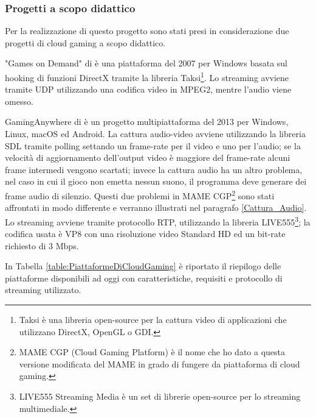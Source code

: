 \subsubsection{Progetti a scopo didattico}
Per la realizzazione di questo progetto sono stati presi in considerazione due progetti di cloud gaming a scopo didattico.

"Games on Demand" di \parencite{ARealTimeStreamingGamesonDemandSystem} è una piattaforma del 2007 per Windows basata sul hooking di funzioni DirectX tramite la libreria Taksi\footnote{Taksi è una libreria open-source per la cattura video di applicazioni che utilizzano DirectX, OpenGL o GDI.}. Lo streaming avviene tramite UDP utilizzando una codifica video in MPEG2, mentre l'audio viene omesso.

GamingAnywhere di \parencite{GamingAnywhere} è un progetto multipiattaforma del 2013 per Windows, Linux, macOS ed Android. La cattura audio-video avviene utilizzando la libreria SDL tramite polling settando un frame-rate per il video e uno per l'audio; se la velocità di aggiornamento dell'output video è maggiore del frame-rate alcuni frame intermedi vengono scartati; invece la cattura audio ha un altro problema, nel caso in cui il gioco non emetta nessun suono, il programma deve generare dei frame audio di silenzio. Questi due problemi in MAME CGP\footnote{MAME CGP (Cloud Gaming Platform) è il nome che ho dato a questa versione modificata del MAME in grado di fungere da piattaforma di cloud gaming.} sono stati affrontati in modo differente e verranno illustrati nel paragrafo \ref{Cattura_Audio}. Lo streaming avviene tramite protocollo RTP, utilizzando la libreria LIVE555\footnote{LIVE555 Streaming Media è un set di librerie open-source per lo streaming multimediale.}; la codifica usata è VP8 con una risoluzione video Standard HD ed un bit-rate richiesto di 3 Mbps.

In Tabella \ref{table:PiattaformeDiCloudGaming} è riportato il riepilogo delle piattaforme disponibili ad oggi con caratteristiche, requisiti e protocollo di streaming utilizzato.

